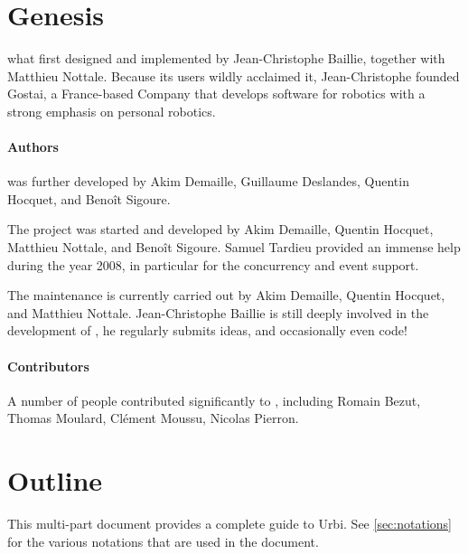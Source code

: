 \section{Genesis}

\urbi what first designed and implemented by Jean-Christophe Baillie,
together with Matthieu Nottale.  Because its users wildly acclaimed it,
Jean-Christophe founded Gostai, a France-based Company that develops
software for robotics with a strong emphasis on personal robotics.

\paragraph{Authors}
 was further developed by Akim Demaille, Guillaume Deslandes, Quentin
Hocquet, and Benoît Sigoure.

The  project was started and developed by Akim Demaille, Quentin
Hocquet, Matthieu Nottale, and Benoît Sigoure.  Samuel Tardieu provided an
immense help during the year 2008, in particular for the concurrency and
event support.

The maintenance is currently carried out by Akim Demaille, Quentin
Hocquet, and Matthieu Nottale.  Jean-Christophe Baillie is still
deeply involved in the development of \us, he regularly submits ideas,
and occasionally even code!

\paragraph{Contributors}

A number of people contributed significantly to \urbi, including Romain
Bezut, Thomas Moulard, Clément Moussu, Nicolas Pierron.

\section{Outline}

This multi-part document provides a complete guide to Urbi.  See
\autoref{sec:notations} for the various notations that are used in the
document.

\newenvironment{partDescription}[2]
{%
  \item[\autoref{#1} --- \nameref{#1}]~\\%
  #2
  \begin{description}%
    \let\itemOrig\item%
    \renewcommand{\item}[1][]{\itemOrig[~~\autoref{##1} --- \nameref{##1}]~\\}%
  }{%
  \end{description}%
}

